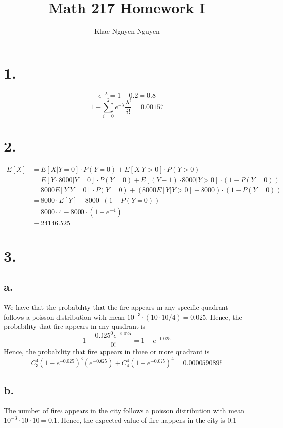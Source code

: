 \documentclass[11pt]{article}
\title{\textbf{Math 217 Homework I}}
\author{Khac Nguyen Nguyen}
\date{}
\begin{document}
\section*{1.}
\[
    e^{-\lambda} = 1-0.2 = 0.8    
\]
\[
    1 - \sum_{i=0}^2 e^{-\lambda} \frac{\lambda^i}{i!} = 0.00157
\]
\pagebreak
\section*{2.}
\begin{equation*}
    \begin{aligned}
        E[X] 
        &= E[X|Y=0] \cdot P(Y=0) + E[X|Y>0] \cdot P(Y>0)  \\
        &= E[Y\cdot 8000|Y=0] \cdot P(Y=0) + E[(Y-1)\cdot 8000|Y>0] \cdot (1-P(Y=0)) \\
        &= 8000 E[Y|Y=0] \cdot P(Y=0) + (8000 E[Y|Y>0] - 8000) \cdot (1-P(Y=0)) \\
        &= 8000 \cdot E[Y] - 8000 \cdot (1-P(Y=0)) \\
        &= 8000 \cdot 4 -8000\cdot (1-e^{-4}) \\
        &= 24146.525
    \end{aligned}
\end{equation*}
\pagebreak
\section*{3.}
\subsection*{a.}
We have that the probability that 
the fire appears in any specific quadrant follows a poisson distribution with mean 
$10^{-3} \cdot (10\cdot 10 /4) = 0.025$. Hence, the probability that fire appears in any quadrant is 
\[
    1 - \frac{0.025^0 e^{-0.025}}{0!} = 1 - e^{-0.025}  
\]
Hence, the probability that fire appears in three or more quadrant is 
\[
    C_3^4 (1-e^{-0.025})^3 (e^{-0.025}) + C_4^4 (1-e^{-0.025})^4 = 0.0000590895
\]
\subsection*{b.}
The number of fires appears in the city follows a poisson distribution with mean 
$10^{-3} \cdot 10 \cdot 10 = 0.1$.
Hence, the expected value of fire happens in the city is 0.1
\pagebreak
\end{document}

